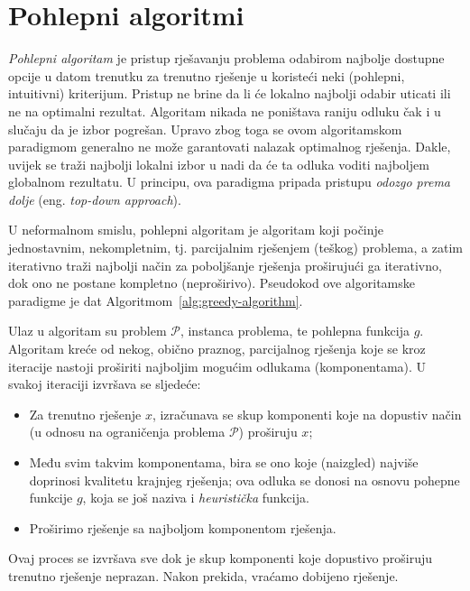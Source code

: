  
\section{Pohlepni algoritmi}
\textit{Pohlepni algoritam} je pristup rješavanju problema odabirom najbolje dostupne opcije u datom trenutku za trenutno rješenje u koristeći neki (pohlepni, intuitivni) kriterijum. Pristup ne brine da li će lokalno najbolji odabir uticati ili ne na optimalni rezultat. Algoritam nikada ne poništava raniju odluku čak i u slučaju da je izbor pogrešan. Upravo zbog toga se ovom algoritamskom paradigmom generalno ne može  garantovati nalazak optimalnog rješenja. Dakle, uvijek se traži najbolji lokalni izbor u nadi da će ta odluka voditi   najboljem globalnom rezultatu. U principu, ova paradigma pripada   pristupu \textit{odozgo prema dolje} (eng. \textit{top-down approach}). 

U neformalnom smislu, pohlepni algoritam je algoritam koji počinje jednostavnim, nekompletnim, tj. parcijalnim rješenjem (teškog) problema, a zatim iterativno traži najbolji način za poboljšanje rješenja proširujući ga iterativno, dok ono ne postane kompletno (neproširivo). Pseudokod ove algoritamske paradigme je dat Algoritmom~\ref{alg:greedy-algorithm}. 

Ulaz u algoritam su problem $\mathcal{P}$, instanca problema, te pohlepna funkcija $g$.  Algoritam kreće od nekog, obično praznog, parcijalnog rješenja koje se kroz iteracije nastoji proširiti najboljim mogućim odlukama (komponentama). U svakoj iteraciji izvršava se sljedeće:
 \begin{itemize}
 	\item Za trenutno rješenje $x$, izračunava se skup komponenti koje na dopustiv način (u odnosu na ograničenja problema $\mathcal{P}$) proširuju $x$;
 	\item Među svim takvim komponentama, bira se ono koje (naizgled) najviše doprinosi kvalitetu krajnjeg rješenja; ova odluka se donosi na osnovu pohepne funkcije $g$, koja se još naziva i \textit{heuristička} funkcija. 
 	\item Proširimo rješenje sa najboljom komponentom rješenja.
 \end{itemize}
Ovaj proces se izvršava sve dok je skup komponenti koje dopustivo proširuju trenutno rješenje neprazan. Nakon prekida, vraćamo dobijeno rješenje.


